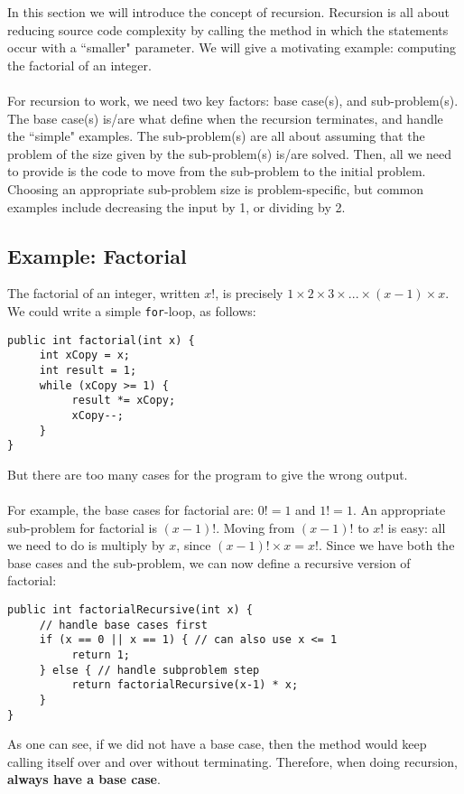%
In this section we will introduce the concept of recursion. Recursion is all about reducing source code complexity by calling the method in which the statements occur with a ``smaller" parameter. We will give a motivating example: computing the factorial of an integer. 
\\ \\
For recursion to work, we need two key factors: base case(s), and sub-problem(s). The base case(s) is/are what define when the recursion terminates, and handle the ``simple" examples. The sub-problem(s) are all about assuming that the problem of the size given by the sub-problem(s) is/are solved. Then, all we need to provide is the code to move from the sub-problem to the initial problem. Choosing an appropriate sub-problem size is problem-specific, but common examples include decreasing the input by 1, or dividing by 2.

\subsection{Example: Factorial}
The factorial of an integer, written $x!$, is precisely $1 \times 2 \times 3 \times ... \times (x-1) \times x$. We could write a simple \verb|for|-loop, as follows:
\begin{lstlisting}
public int factorial(int x) {
     int xCopy = x;
     int result = 1;
     while (xCopy >= 1) {
          result *= xCopy;
          xCopy--;
     }
}
\end{lstlisting}
But there are too many cases for the program to give the wrong output.
\\ \\
For example, the base cases for factorial are: $0! = 1$ and $1! = 1$. An appropriate sub-problem for factorial is $(x-1)!$. Moving from $(x-1)!$ to $x!$ is easy: all we need to do is multiply by $x$, since $(x-1)! \times x = x!$. Since we have both the base cases and the sub-problem, we can now define a recursive version of factorial:
\begin{lstlisting}
public int factorialRecursive(int x) {
     // handle base cases first
     if (x == 0 || x == 1) { // can also use x <= 1
          return 1;
     } else { // handle subproblem step
          return factorialRecursive(x-1) * x;
     }
}
\end{lstlisting}
As one can see, if we did not have a base case, then the method would keep calling itself over and over without terminating. Therefore, when doing recursion, \textbf{always have a base case}. 

